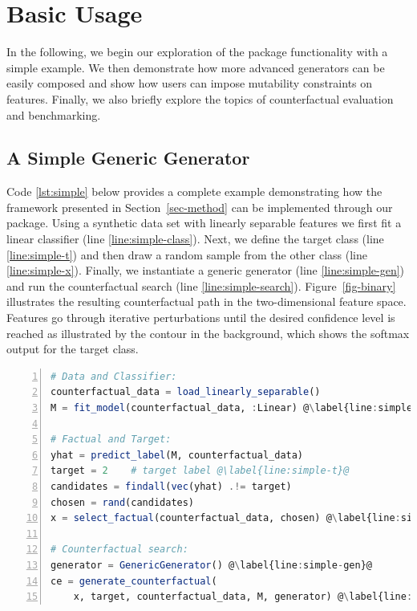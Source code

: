 \documentclass{juliacon}
\begin{document}
\hypertarget{sec-use}{%
\section{Basic Usage}\label{sec-use}}

In the following, we begin our exploration of the package functionality
with a simple example. We then demonstrate how more advanced generators
can be easily composed and show how users can impose mutability
constraints on features. Finally, we also briefly explore the topics of
counterfactual evaluation and benchmarking.

\hypertarget{sec-simple}{%
\subsection{A Simple Generic Generator}\label{sec-simple}}

Code \ref{lst:simple} below provides a complete example demonstrating
how the framework presented in Section~\ref{sec-method} can be
implemented through our package. Using a synthetic data set with
linearly separable features we first fit a linear classifier (line
\ref{line:simple-class}). Next, we define the target class (line
\ref{line:simple-t}) and then draw a random sample from the other class
(line \ref{line:simple-x}). Finally, we instantiate a generic generator
(line \ref{line:simple-gen}) and run the counterfactual search (line
\ref{line:simple-search}). Figure~\ref{fig-binary} illustrates the
resulting counterfactual path in the two-dimensional feature space.
Features go through iterative perturbations until the desired confidence
level is reached as illustrated by the contour in the background, which
shows the softmax output for the target class.

\begin{lstlisting}[language=Julia, escapechar=@, numbers=left, label={lst:simple}, caption={Standard workflow for generating counterfactuals.}] 
# Data and Classifier:
counterfactual_data = load_linearly_separable()
M = fit_model(counterfactual_data, :Linear) @\label{line:simple-class}@

# Factual and Target:
yhat = predict_label(M, counterfactual_data)
target = 2    # target label @\label{line:simple-t}@
candidates = findall(vec(yhat) .!= target)
chosen = rand(candidates)
x = select_factual(counterfactual_data, chosen) @\label{line:simple-x}@

# Counterfactual search:
generator = GenericGenerator() @\label{line:simple-gen}@
ce = generate_counterfactual(
    x, target, counterfactual_data, M, generator) @\label{line:simple-search}@
\end{lstlisting}
\end{document}
